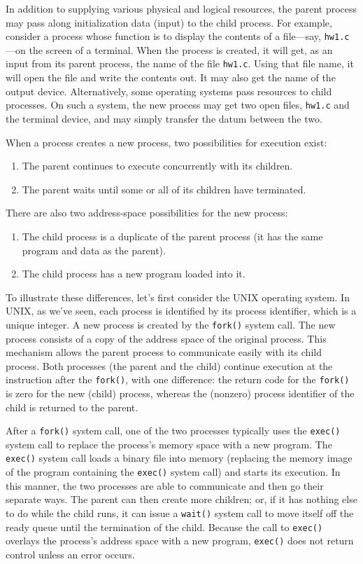 In addition to supplying various physical and logical resources, the parent process may pass along initialization data (input) to the child process. For example, consider a process whose function is to display the contents of a file---say, \texttt{hw1.c}---on the screen of a terminal. When the process is created, it will get, as an input from its parent process, the name of the file \texttt{hw1.c}. Using that file name, it will open the file and write the contents out. It may also get the name of the output device. Alternatively, some operating systems pass resources to child processes. On such a system, the new process may get two open files, \texttt{hw1.c} and the terminal device, and may simply transfer the datum between the two.

When a process creates a new process, two possibilities for execution exist:
\begin{enumerate}
    \item The parent continues to execute concurrently with its children.
    \item The parent waits until some or all of its children have terminated.
\end{enumerate}
There are also two address-space possibilities for the new process:
\begin{enumerate}
    \item The child process is a duplicate of the parent process (it has the same program and data as the parent).
    \item The child process has a new program loaded into it.
\end{enumerate}
To illustrate these differences, let's first consider the UNIX operating system. In UNIX, as we've seen, each process is identified by its process identifier, which is a unique integer. A new process is created by the \texttt{fork()} system call. The new process consists of a copy of the address space of the original process. This mechanism allows the parent process to communicate easily with its child process. Both processes (the parent and the child) continue execution at the instruction after the \texttt{fork()}, with one difference: the return code for the \texttt{fork()} is zero for the new (child) process, whereas the (nonzero) process identifier of the child is returned to the parent.

After a \texttt{fork()} system call, one of the two processes typically uses the \texttt{exec()} system call to replace the process's memory space with a new program. The \texttt{exec()} system call loads a binary file into memory (replacing the memory image of the program containing the \texttt{exec()} system call) and starts its execution. In this manner, the two processes are able to communicate and then go their separate ways. The parent can then create more children; or, if it has nothing else to do while the child runs, it can issue a \texttt{wait()} system call to move itself off the ready queue until the termination of the child. Because the call to \texttt{exec()} overlays the process's address space with a new program, \texttt{exec()} does not return control unless an error occurs.

